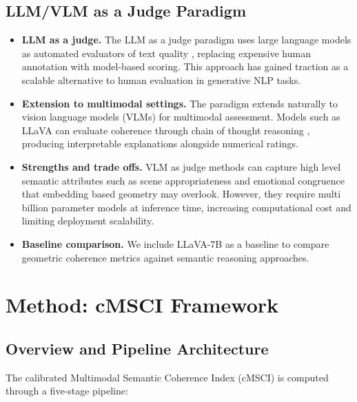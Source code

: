 \documentclass[a4paper,fleqn]{cas-sc}
\begin{document}
\subsection{LLM/VLM as a Judge Paradigm}\label{sec:vlm-judge}


\begin{itemize}

\item \textbf{LLM as a judge.}
The LLM as a judge paradigm uses large language models as automated evaluators of text quality \citep{Zheng2023}, replacing expensive human annotation with model-based scoring. This approach has gained traction as a scalable alternative to human evaluation in generative NLP tasks.

\item \textbf{Extension to multimodal settings.}
The paradigm extends naturally to vision language models (VLMs) for multimodal assessment. Models such as LLaVA \citep{Liu2023} can evaluate coherence through chain of thought reasoning \citep{Wei2022}, producing interpretable explanations alongside numerical ratings.

\item \textbf{Strengths and trade offs.}
VLM as judge methods can capture high level semantic attributes such as scene appropriateness and emotional congruence that embedding based geometry may overlook. However, they require multi billion parameter models at inference time, increasing computational cost and limiting deployment scalability.

\item \textbf{Baseline comparison.}
We include LLaVA-7B as a baseline to compare geometric coherence metrics against semantic reasoning approaches.

\end{itemize}

\section{Method: cMSCI Framework}\label{sec:method}

\subsection{Overview and Pipeline Architecture}\label{sec:pipeline-overview}

The calibrated Multimodal Semantic Coherence Index (cMSCI) is computed through a five-stage pipeline:
\end{document}

